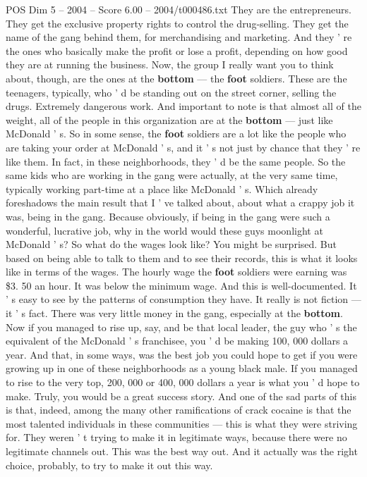 \begin{textsample}{POS Dim 5 – 2004 – Score 6.00 – 2004/t000486.txt}
They are the entrepreneurs.
They get the exclusive property rights to control the drug-selling.
They get the name of the gang behind them, for merchandising and marketing.
And they ' re the ones who basically make the profit or lose a profit, depending on how good they are at running the business.
Now, the group I really want you to think about, though, are the ones at the \textbf{bottom} — the \textbf{foot} soldiers.
These are the teenagers, typically, who ' d be standing out on the street corner, selling the drugs.
Extremely dangerous work.
And important to note is that almost all of the weight, all of the people in this organization are at the \textbf{bottom} — just like McDonald ' s.
So in some sense, the \textbf{foot} soldiers are a lot like the people who are taking your order at McDonald ' s, and it ' s not just by chance that they ' re like them.
In fact, in these neighborhoods, they ' d be the same people.
So the same kids who are working in the gang were actually, at the very same time, typically working part-time at a place like McDonald ' s.
Which already foreshadows the main result that I ' ve talked about, about what a crappy job it was, being in the gang.
Because obviously, if being in the gang were such a wonderful, lucrative job, why in the world would these guys moonlight at McDonald ' s?
So what do the wages look like?
You might be surprised.
But based on being able to talk to them and to see their records, this is what it looks like in terms of the wages.
The hourly wage the \textbf{foot} soldiers were earning was \$3. 50 an hour.
It was below the minimum wage.
And this is well-documented.
It ' s easy to see by the patterns of consumption they have.
It really is not fiction — it ' s fact.
There was very little money in the gang, especially at the \textbf{bottom}.
Now if you managed to rise up, say, and be that local leader, the guy who ' s the equivalent of the McDonald ' s franchisee, you ' d be making 100, 000 dollars a year.
And that, in some ways, was the best job you could hope to get if you were growing up in one of these neighborhoods as a young black male.
If you managed to rise to the very top, 200, 000 or 400, 000 dollars a year is what you ' d hope to make.
Truly, you would be a great success story.
And one of the sad parts of this is that, indeed, among the many other ramifications of crack cocaine is that the most talented individuals in these communities — this is what they were striving for.
They weren ' t trying to make it in legitimate ways, because there were no legitimate channels out.
This was the best way out.
And it actually was the right choice, probably, to try to make it out this way.

\end{textsample}
